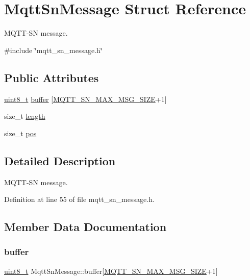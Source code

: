 \hypertarget{structMqttSnMessage}{}\section{Mqtt\+Sn\+Message Struct Reference}
\label{structMqttSnMessage}


M\+Q\+T\+T-\/\+SN message.  




{\ttfamily \#include \char`\"{}mqtt\+\_\+sn\+\_\+message.\+h\char`\"{}}

\subsection*{Public Attributes}
\begin{DoxyCompactItemize}
\item 
\hyperlink{stdint_8h_aba7bc1797add20fe3efdf37ced1182c5}{uint8\+\_\+t} \hyperlink{structMqttSnMessage_a8e68c69d0e3ee59c0cc88aa146fe489a}{buffer} \mbox{[}\hyperlink{mqtt__sn__message_8h_ada138ba791ef46d36fe224cf038bf38b}{M\+Q\+T\+T\+\_\+\+S\+N\+\_\+\+M\+A\+X\+\_\+\+M\+S\+G\+\_\+\+S\+I\+ZE}+1\mbox{]}
\item 
size\+\_\+t \hyperlink{structMqttSnMessage_a717fa07b0fe9c37cba433a2e913332d0}{length}
\item 
size\+\_\+t \hyperlink{structMqttSnMessage_aa1c2334a5ac954ee288fd66eabfb17ac}{pos}
\end{DoxyCompactItemize}


\subsection{Detailed Description}
M\+Q\+T\+T-\/\+SN message. 

Definition at line 55 of file mqtt\+\_\+sn\+\_\+message.\+h.



\subsection{Member Data Documentation}
\mbox{\label{structMqttSnMessage_a8e68c69d0e3ee59c0cc88aa146fe489a}} 
\subsubsection{\texorpdfstring{buffer}{buffer}}
{\footnotesize\ttfamily \hyperlink{stdint_8h_aba7bc1797add20fe3efdf37ced1182c5}{uint8\+\_\+t} Mqtt\+Sn\+Message\+::buffer\mbox{[}\hyperlink{mqtt__sn__message_8h_ada138ba791ef46d36fe224cf038bf38b}{M\+Q\+T\+T\+\_\+\+S\+N\+\_\+\+M\+A\+X\+\_\+\+M\+S\+G\+\_\+\+S\+I\+ZE}+1\mbox{]}}



